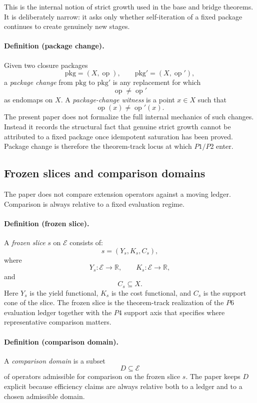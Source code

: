 This is the internal notion of strict growth used in the base and bridge theorems. It is deliberately narrow: it asks only whether self-iteration of a fixed package continues to create genuinely new stages.

\paragraph{Definition (package change).}
Given two closure packages
\[
\mathrm{pkg}=(X,\operatorname{op}), \qquad \mathrm{pkg}'=(X,\operatorname{op}'),
\]
a \emph{package change} from $\mathrm{pkg}$ to $\mathrm{pkg}'$ is any replacement for which
\[
\operatorname{op}\neq \operatorname{op}'
\]
as endomaps on $X$. A \emph{package-change witness} is a point $x\in X$ such that
\[
\operatorname{op}(x)\neq \operatorname{op}'(x).
\]
The present paper does not formalize the full internal mechanics of such changes. Instead it records the structural fact that genuine strict growth cannot be attributed to a fixed package once idempotent saturation has been proved. Package change is therefore the theorem-track locus at which \(P1/P2\) enter.

\subsection*{Frozen slices and comparison domains}

The paper does not compare extension operators against a moving ledger. Comparison is always relative to a fixed evaluation regime.

\paragraph{Definition (frozen slice).}
A \emph{frozen slice} $s$ on $\mathcal{E}$ consists of:
\[
s=(Y_s,K_s,C_s),
\]
where
\[
Y_s \colon \mathcal{E}\to \mathbb{R},\qquad
K_s \colon \mathcal{E}\to \mathbb{R},
\]
and
\[
C_s \subseteq X.
\]
Here $Y_s$ is the yield functional, $K_s$ is the cost functional, and $C_s$ is the support cone of the slice. The frozen slice is the theorem-track realization of the \(P6\) evaluation ledger together with the \(P4\) support axis that specifies where representative comparison matters.

\paragraph{Definition (comparison domain).}
A \emph{comparison domain} is a subset
\[
D\subseteq \mathcal{E}
\]
of operators admissible for comparison on the frozen slice $s$. The paper keeps $D$ explicit because efficiency claims are always relative both to a ledger and to a chosen admissible domain.

